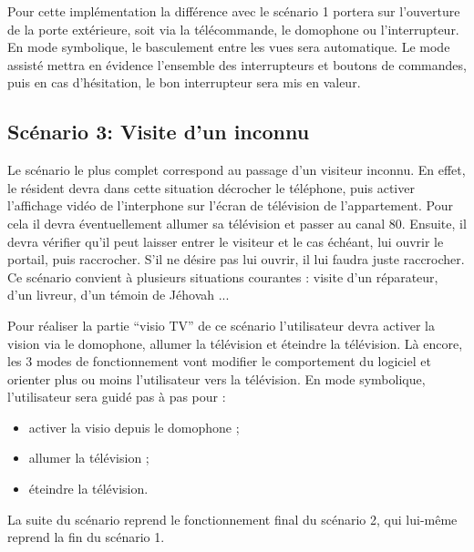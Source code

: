Pour cette implémentation la différence avec le scénario 1 portera sur l'ouverture de la porte extérieure, soit via la télécommande, le domophone ou l'interrupteur. En mode symbolique, le basculement entre les vues sera automatique. Le mode assisté mettra en évidence l'ensemble des interrupteurs et boutons de commandes, puis en cas d'hésitation, le bon interrupteur sera mis en valeur.

\subsection{Scénario 3: Visite d'un inconnu}

Le scénario le plus complet correspond au passage d'un visiteur inconnu. En effet, le résident devra dans cette situation décrocher le téléphone, puis activer l'affichage vidéo de l'interphone sur l'écran de télévision de l'appartement. Pour cela il devra éventuellement allumer sa télévision et passer au canal 80. Ensuite, il devra vérifier qu'il peut laisser entrer le visiteur et le cas échéant, lui ouvrir le portail, puis raccrocher. S'il ne désire pas lui ouvrir, il lui faudra juste raccrocher.
Ce scénario convient à plusieurs situations courantes : visite d'un réparateur, d'un livreur, d'un témoin de Jéhovah ...

Pour réaliser la partie \enquote{visio TV} de ce scénario l'utilisateur devra activer la vision via le domophone, allumer la télévision et éteindre la télévision. Là encore, les 3 modes de fonctionnement vont modifier le comportement du logiciel et orienter plus ou moins l'utilisateur vers la télévision. En mode symbolique, l'utilisateur sera guidé pas à pas pour :
\begin{itemize}
	\item activer la visio depuis le domophone ;
	\item allumer la télévision ;
	\item éteindre la télévision.
\end{itemize}
La suite du scénario reprend le fonctionnement final du scénario 2, qui lui-même reprend la fin du scénario 1.

